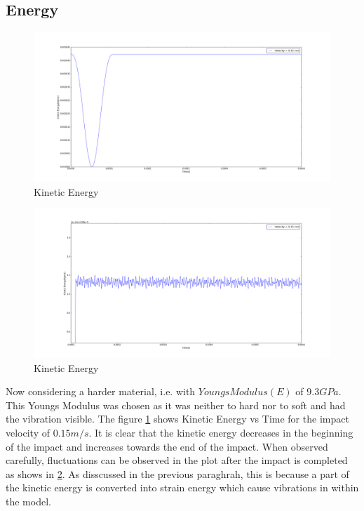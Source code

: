 \subsection{Energy}
\begin{figure}[H]
\includegraphics[width=1.0\textwidth]{../images/KE/KE.png}
\caption{Kinetic Energy}
\label{fig:KE}
\end{figure}
\begin{figure}[H]
\includegraphics[width=1.0\textwidth]{../images/KE/KE-zoomed.png}
\caption{Kinetic Energy}
\label{fig:KEzoomed}
\end{figure}
Now considering a harder material, i.e. with $Youngs Modulus(E)$ of $9.3GPa$. This Youngs Modulus was chosen as it was neither to hard nor to soft and had the vibration visible. The figure \ref{fig:KE} shows Kinetic Energy vs Time for the impact velocity of $0.15m/s$. It is clear that the kinetic energy decreases in the beginning of the impact and increases towards the end of the impact. When observed carefully, fluctuations can be observed in the plot after the impact is completed as shows in \ref{fig:KEzoomed}. As disscussed in the previous paraghrah, this is because a part of the kinetic energy is converted into strain energy which cause vibrations in within the model.

